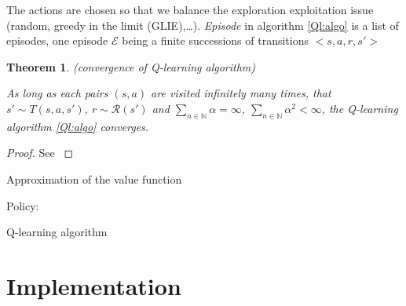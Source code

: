 \documentclass[14pt,a4paper]{article}
\let\oldpart\part
\renewcommand\part{\newpage\oldpart}
\newtheorem{theorem}{Theorem}
\theoremstyle{definition}
\begin{document}
The actions are chosen so that we balance the exploration exploitation issue (random, greedy in the limit (GLIE),\ldots). \emph{Episode} in algorithm \ref{Ql:algo} is a list of episodes, one episode $\mathcal{E}$ being a finite successions of transitions  $<s,a,r,s'>$



\begin{theorem} (convergence of Q-learning algorithm)

As long as each pairs $(s,a)$ are visited infinitely many times, that $s'\sim T(s,a,s')$, $r \sim \mathcal{R}(s')$ and  $\underset{n \in \mathbb{N}}{\sum} \alpha = \infty$, $\underset{n \in \mathbb{N}}{\sum} \alpha^2 < \infty$, the Q-learning algorithm \ref{Ql:algo} converges.

\label{conv_theorem}
\end{theorem}

\begin{proof} 


See \citep{Watkins_article}

\end{proof}

\begin{algorithm}
    
	
	Approximation of the value function
     
     Policy: \\
     
	\caption{Q-learning algorithm}
	\label{Ql:algo}
\end{algorithm}

\newpage


\part{Implementation} \label{Implementation}
\end{document}
